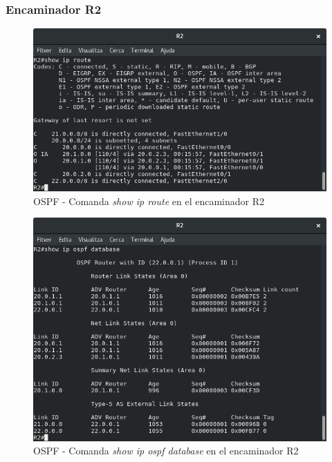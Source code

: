 \documentclass[10pt]{article}
\begin{document}
\subsubsection{Encaminador R2}
\begin{figure}[H]
\begin{center}
\includegraphics[scale=0.5]{Images/ospf-R2-route.png}
\caption{OSPF - Comanda \textit{show ip route} en el encaminador R2}
\end{center}
\end{figure}
\begin{figure}[H]
\begin{center}
\includegraphics[scale=0.5]{Images/ospf-R2-database.png}
\caption{OSPF - Comanda \textit{show ip ospf database} en el encaminador R2}
\end{center}
\end{figure}
\end{document}
